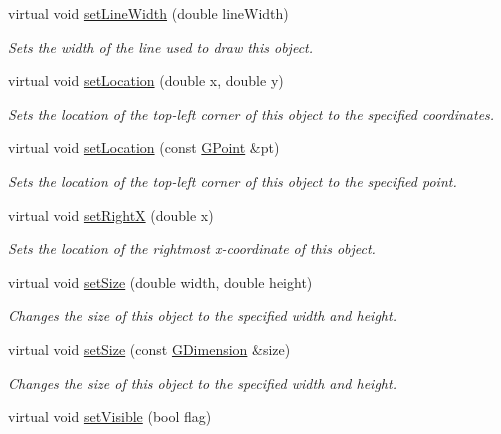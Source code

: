 \begin{DoxyCompactItemize}
virtual void \mbox{\hyperlink{classGObject_afd6a47c6ea6a1f85ca05a65ba3ff3477}{set\+Line\+Width}} (double line\+Width)
\begin{DoxyCompactList}\small\item\em Sets the width of the line used to draw this object. \end{DoxyCompactList}\item 
virtual void \mbox{\hyperlink{classGObject_a04594e8ba9b98513a64f1da00dcae18c}{set\+Location}} (double x, double y)
\begin{DoxyCompactList}\small\item\em Sets the location of the top-\/left corner of this object to the specified coordinates. \end{DoxyCompactList}\item 
virtual void \mbox{\hyperlink{classGObject_aa8480c0b7166cdf8f784cece06ab353f}{set\+Location}} (const \mbox{\hyperlink{classGPoint}{G\+Point}} \&pt)
\begin{DoxyCompactList}\small\item\em Sets the location of the top-\/left corner of this object to the specified point. \end{DoxyCompactList}\item 
virtual void \mbox{\hyperlink{classGObject_a3c90b758cdc2c911c9ef76c4360eb912}{set\+RightX}} (double x)
\begin{DoxyCompactList}\small\item\em Sets the location of the rightmost x-\/coordinate of this object. \end{DoxyCompactList}\item 
virtual void \mbox{\hyperlink{classGObject_aca25d49481f9bf5fc8f7df4c086c4ce7}{set\+Size}} (double width, double height)
\begin{DoxyCompactList}\small\item\em Changes the size of this object to the specified width and height. \end{DoxyCompactList}\item 
virtual void \mbox{\hyperlink{classGObject_ae2b628228f192c2702c4ce941b2af68f}{set\+Size}} (const \mbox{\hyperlink{classGDimension}{G\+Dimension}} \&size)
\begin{DoxyCompactList}\small\item\em Changes the size of this object to the specified width and height. \end{DoxyCompactList}\item 
virtual void \mbox{\hyperlink{classGObject_a88203f28224315d9f4471212f4af8ed3}{set\+Visible}} (bool flag)

\end{DoxyCompactItemize}
